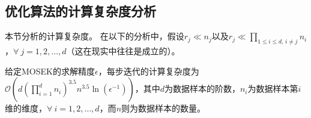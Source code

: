\subsection{优化算法的计算复杂度分析}
本节分析的计算复杂度。
在以下的分析中，假设$r_{j}\ll n_{j}$以及$r_{j}\ll\prod_{1\le i\le d,\,i\neq j}n_{i}$，$\forall~ j=1,2,\ldots,d$（这在现实中往往是成立的）。
\begin{theorem}\label{thm:complexity}\kaishu
给定MOSEK的求解精度$\epsilon$，每步迭代的计算复杂度为$\mathcal{O}(d\allowbreak(\prod_{i=1}^{d}{n_i})^{3.5} n^{3.5}\ln(\epsilon^{-1}))$，其中$d$为数据样本的阶数，$n_{i}$为数据样本第$i$维的维度，$\forall~ i=1,2,\ldots,d$，而$n$则为数据样本的数量。
\end{theorem}
